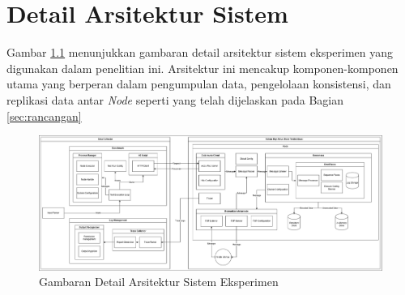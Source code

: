 \chapter{Detail Arsitektur Sistem}
\label{appendix:detailed-architecture}

Gambar \ref{fig:detailed-architecture} menunjukkan gambaran detail arsitektur sistem eksperimen yang digunakan dalam penelitian ini. Arsitektur ini mencakup komponen-komponen utama yang berperan dalam pengumpulan data, pengelolaan konsistensi, dan replikasi data antar \textit{Node} seperti yang telah dijelaskan pada Bagian \ref{sec:rancangan}

\begin{figure}[ht]
	\centering
	\includegraphics[width=\textwidth]{resources/appendix/detailed-architecture.png}

	\caption{Gambaran Detail Arsitektur Sistem Eksperimen}
	\label{fig:detailed-architecture}
\end{figure}